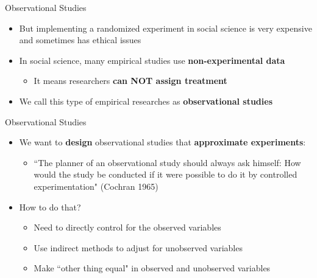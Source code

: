 \documentclass[hyperref={pdfpagelabels=false}]{beamer}
\begin{document}
\begin{frame}{Observational Studies}
	\begin{itemize} 
		
		\item But implementing a randomized experiment in social science is very expensive and sometimes has ethical issues
		\vspace{0.3cm}
		\item In social science, many empirical studies use \textbf{non-experimental data} 
		\vspace{0.3cm}
			\begin{itemize} 
	\item It means researchers \textbf{can NOT assign treatment	}
			\end{itemize}
				\vspace{0.3cm}
		\item We call this type of empirical researches as \textbf{observational studies}
		
	\end{itemize}
\end{frame}


\begin{frame}{Observational Studies}
	\begin{itemize} 
	
		\item We want to \textbf{design} observational studies that \textbf{approximate experiments}:
		\begin{itemize}
			\vspace{0.3cm}
			\item ``The planner of an observational study should always ask himself: How would the study be conducted if it were possible to do it by controlled experimentation" (Cochran 1965)
		\end{itemize}
				\vspace{0.3cm}
	\item How to do that?
					\vspace{0.3cm}
				\begin{itemize}			
	\item Need to directly control for the observed variables
		\vspace{0.3cm}
	\item Use indirect methods to adjust for unobserved variables
	\vspace{0.3cm}
	\item Make ``other thing equal" in observed and unobserved variables
		\end{itemize}
	\end{itemize}
\end{frame}
\end{document}
